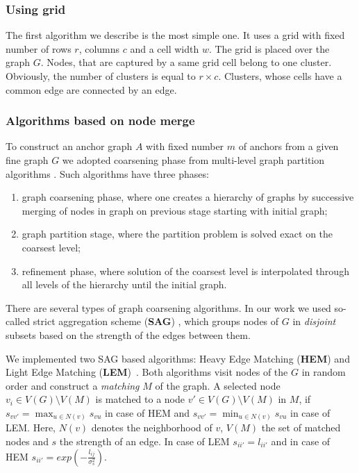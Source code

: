 \subsubsection{Using grid}	
The first algorithm we describe is the most simple one. It uses a grid with fixed number of rows $r$, columns $c$ and a cell width $w$. The grid is placed over the graph $G$. Nodes, that are captured by a same grid cell belong to one cluster. Obviously, the number of clusters is equal to $r\times c$. Clusters, whose cells have a common edge are connected by an edge.
	                                                 
\subsubsection{Algorithms based on node merge}	                         
To construct an anchor graph $A$ with fixed number $m$ of anchors from a given fine graph $G$ we adopted coarsening phase from multi-level graph partition algorithms \cite{Chevalier09_GP, Safro2012_GC, Karypis95_GP, Hendrickson1995}.
Such algorithms have three phases: 
\begin{enumerate}
	\item graph coarsening phase, where one creates a hierarchy of graphs by successive merging of nodes in graph on previous stage starting with initial graph;
	\item graph partition stage, where the partition problem is solved exact on the coarsest level;
	\item refinement phase, where solution of the coarsest level is interpolated through all levels of the hierarchy until the initial graph.
\end{enumerate}
There are several types of graph coarsening algorithms. In our work we used so-called strict aggregation scheme (\textbf{SAG}) \cite{Chevalier09_GP}, which groups nodes of $G$ in \emph{disjoint} subsets based on the strength of the edges between them. 

We implemented two SAG based algorithms: Heavy Edge Matching (\textbf{HEM}) and Light Edge Matching (\textbf{LEM})~\cite{Chevalier09_GP}. Both algorithms visit nodes of the $G$ in random order and construct a \emph{matching} $M$ of the graph. A selected node $v_i\in V(G)\setminus V(M)$ is matched to a node $v\prime\in V(G)\setminus V(M)$ in $M$, if $s_{vv\prime} = \max_{u\in N(v)} s_{vu}$ in case of HEM and
$s_{vv\prime} = \min_{u\in N(v)} s_{vu}$ in case of LEM. Here, $N(v)$ denotes the neighborhood of $v$, $V(M)$ the set of matched nodes and $s$ the strength of an edge. In case of LEM $s_{ii\prime} = l_{ii\prime}$ and in case of HEM $s_{ii\prime} = exp(-\frac{l_{ij}}{\sigma^2_{s}})$.

